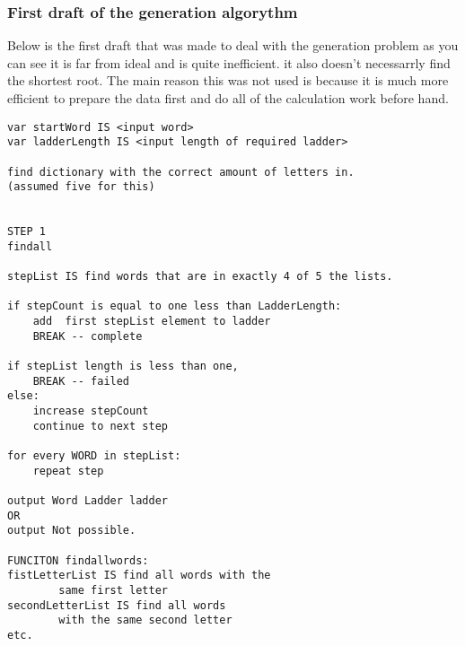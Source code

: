\documentclass[final,a4paper,twoside,12pt]{report}
\begin{document}
\subsubsection{First draft of the generation algorythm}
Below is the first draft that was made to deal with the generation problem
as you can see it is far from ideal and is quite inefficient. it also doesn't
necessarrly find the shortest root. The main reason this was not used is
because it is much more efficient to prepare the data first and do all of the
calculation work before hand.
\begin{verbatim}
var startWord IS <input word>
var ladderLength IS <input length of required ladder>

find dictionary with the correct amount of letters in. 
(assumed five for this)


STEP 1
findall

stepList IS find words that are in exactly 4 of 5 the lists.

if stepCount is equal to one less than LadderLength:
    add  first stepList element to ladder
    BREAK -- complete

if stepList length is less than one,
    BREAK -- failed
else:
    increase stepCount
    continue to next step

for every WORD in stepList:
    repeat step

output Word Ladder ladder
OR
output Not possible.

FUNCITON findallwords:
fistLetterList IS find all words with the 
        same first letter
secondLetterList IS find all words 
        with the same second letter
etc.
\end{verbatim}
\end{document}
